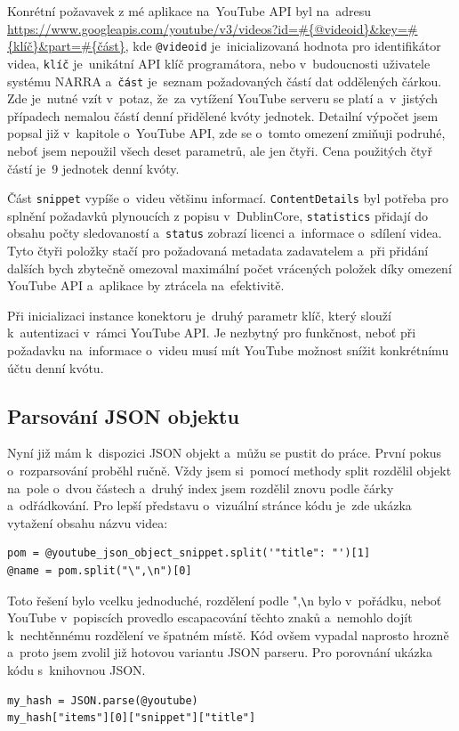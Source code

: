 \par Konrétní požavavek z mé aplikace na~YouTube API byl na~adresu \url{https://www.googleapis.com/youtube/v3/videos?id=#{@videoid}&key=#{klíč}}\hfill \break \url{&part=#{část}}\cite{apiurl}, kde \texttt{@videoid} je~inicializovaná hodnota pro identifikátor videa, \texttt{klíč} je~unikátní API klíč programátora, nebo v~budoucnosti uživatele systému NARRA a~\texttt{část} je~seznam požadovaných částí dat oddělených čárkou. Zde je~nutné vzít v~potaz, že~za vytížení YouTube serveru se platí a~v~jistých případech nemalou částí denní přidělené kvóty\cite{googleconsole1} jednotek. Detailní výpočet jsem popsal již v~kapitole o~YouTube API, zde se o~tomto omezení zmiňuji podruhé, neboť jsem nepoužil všech deset parametrů, ale jen čtyři. Cena použitých čtyř částí je~9 jednotek denní kvóty.
\par Část \texttt{snippet} vypíše o~videu většinu informací. \texttt{ContentDetails} byl potřeba pro splnění požadavků plynoucích z popisu v~DublinCore, \texttt{statistics} přidají do obsahu počty sledovaností a~\texttt{status} zobrazí licenci a~informace o~sdílení videa. Tyto čtyři položky stačí pro požadovaná metadata zadavatelem a~při přidání dalších bych zbytečně omezoval maximální počet vrácených položek díky omezení YouTube API a~aplikace by ztrácela na~efektivitě.
\par Při inicializaci instance konektoru je~druhý parametr klíč, který slouží k~autentizaci v~rámci YouTube API. Je nezbytný pro funkčnost, neboť při požadavku na~informace o~videu musí mít YouTube možnost snížit konkrétnímu účtu denní kvótu.

\subsection{Parsování JSON objektu}
\par Nyní již mám k~dispozici JSON objekt a~můžu se pustit do práce. První pokus o~rozparsování proběhl ručně. Vždy jsem si~pomocí methody split rozdělil objekt na~pole o~dvou částech a~druhý index jsem rozdělil znovu podle čárky a~odřádkování. Pro lepší představu o~vizuální stránce kódu je~zde ukázka vytažení obsahu názvu videa:
\begin{verbatim}
pom = @youtube_json_object_snippet.split('"title": "')[1]
@name = pom.split("\",\n")[0]
\end{verbatim}
\par Toto řešení bylo vcelku jednoduché, rozdělení podle ",\verb|\|n bylo v~pořádku, neboť YouTube v~popiscích provedlo escapacování těchto znaků a~nemohlo dojít k~nechtěnnému rozdělení ve špatném místě. Kód ovšem vypadal naprosto hrozně a~proto jsem zvolil již hotovou variantu JSON parseru. Pro porovnání ukázka kódu s~knihovnou JSON.
\begin{verbatim}
my_hash = JSON.parse(@youtube)
my_hash["items"][0]["snippet"]["title"]
\end{verbatim}

